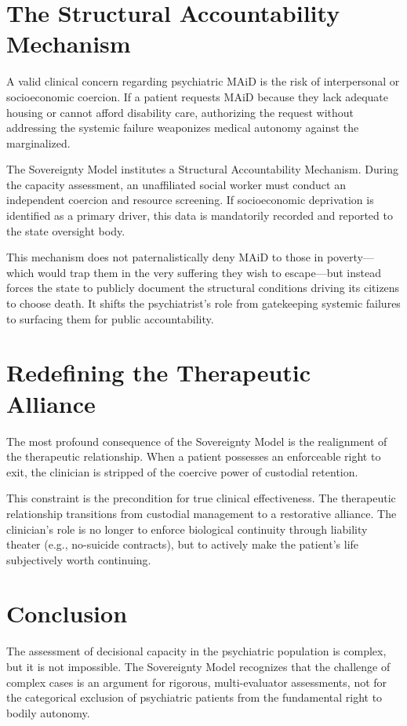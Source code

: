 \documentclass[10pt, twocolumn, letterpaper]{article}
\begin{document}
\section{The Structural Accountability Mechanism}

A valid clinical concern regarding psychiatric MAiD is the risk of interpersonal or socioeconomic coercion. If a patient requests MAiD because they lack adequate housing or cannot afford disability care, authorizing the request without addressing the systemic failure weaponizes medical autonomy against the marginalized.

The Sovereignty Model institutes a Structural Accountability Mechanism. During the capacity assessment, an unaffiliated social worker must conduct an independent coercion and resource screening. If socioeconomic deprivation is identified as a primary driver, this data is mandatorily recorded and reported to the state oversight body.

This mechanism does not paternalistically deny MAiD to those in poverty---which would trap them in the very suffering they wish to escape---but instead forces the state to publicly document the structural conditions driving its citizens to choose death. It shifts the psychiatrist's role from gatekeeping systemic failures to surfacing them for public accountability.

\section{Redefining the Therapeutic Alliance}

The most profound consequence of the Sovereignty Model is the realignment of the therapeutic relationship. When a patient possesses an enforceable right to exit, the clinician is stripped of the coercive power of custodial retention.

This constraint is the precondition for true clinical effectiveness. The therapeutic relationship transitions from custodial management to a restorative alliance. The clinician's role is no longer to enforce biological continuity through liability theater (e.g., no-suicide contracts), but to actively make the patient's life subjectively worth continuing.

\section{Conclusion}

The assessment of decisional capacity in the psychiatric population is complex, but it is not impossible. The Sovereignty Model recognizes that the challenge of complex cases is an argument for rigorous, multi-evaluator assessments, not for the categorical exclusion of psychiatric patients from the fundamental right to bodily autonomy. 
\end{document}
